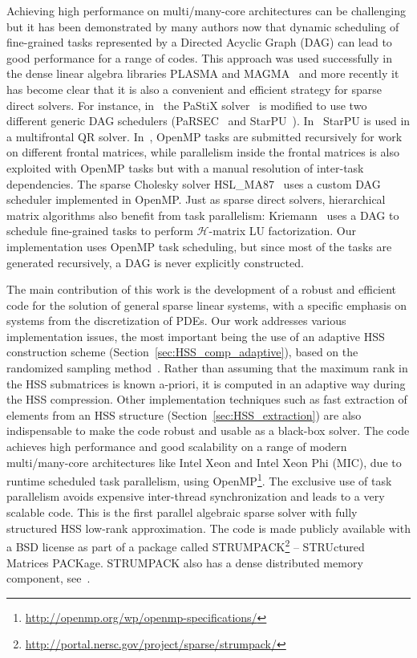 \documentclass{article}
\newcommand{\tm}{\textsuperscript{\textregistered}}
\begin{document}
Achieving high performance on multi/many-core architectures can be
challenging but it has been demonstrated by many authors now that
dynamic scheduling of fine-grained tasks represented by a Directed
Acyclic Graph (DAG) can lead to good performance for a range of codes.
This approach was used successfully in the dense linear algebra
libraries PLASMA and MAGMA~\cite{agullo2009numerical} and more
recently it has become clear that it is also a convenient and
efficient strategy for sparse direct solvers. For instance,
in~\cite{lacoste2014taking} the PaStiX solver~\cite{henon2002pastix}
is modified to use two different generic DAG schedulers
(PaRSEC~\cite{bosilca2012dague} and
StarPU~\cite{augonnet2011starpu}). In~\cite{agullo2013multifrontal}
StarPU is used in a multifrontal QR solver.
In~\cite{kim2014parallel}, OpenMP tasks are submitted recursively for
work on different frontal matrices, while parallelism inside the
frontal matrices is also exploited with OpenMP tasks but with a manual
resolution of inter-task dependencies. The sparse Cholesky solver
HSL\_MA87~\cite{hogg2010design} uses a custom DAG scheduler
implemented in OpenMP. Just as sparse direct solvers, hierarchical
matrix algorithms also benefit from task parallelism:
Kriemann~\cite{kriemann2013} uses a DAG to schedule fine-grained tasks
to perform $\mathcal{H}$-matrix LU factorization. Our implementation
uses OpenMP task scheduling, but since most of the tasks are generated
recursively, a DAG is never explicitly constructed.

The main contribution of this work is the development of a robust and
efficient code for the solution of general sparse linear systems, with
a specific emphasis on systems from the discretization of PDEs.
Our work addresses various implementation issues, the most important
being the use of an adaptive HSS construction scheme
(Section~\ref{sec:HSS_comp_adaptive}), based on the randomized
sampling method~\cite{martinsson2011fast}.  Rather than assuming that
the maximum rank in the HSS submatrices is known a-priori, it is
computed in an adaptive way during the HSS compression. Other
implementation techniques such as fast extraction of elements from an
HSS structure (Section~\ref{sec:HSS_extraction}) are also
indispensable to make the code robust and usable as a black-box
solver.  The code achieves high performance and good scalability on a
range of modern multi/many-core architectures like Intel\tm{} Xeon and
Intel\tm{} Xeon Phi (MIC), due to runtime scheduled task parallelism,
using
OpenMP\footnote{\url{http://openmp.org/wp/openmp-specifications/}}.
The exclusive use of task parallelism avoids expensive inter-thread
synchronization and leads to a very scalable code.  This is the first
parallel algebraic sparse solver with fully structured HSS low-rank
approximation. The code is made publicly available with a BSD license
as part of a package called
STRUMPACK\footnote{\url{http://portal.nersc.gov/project/sparse/strumpack/}}
-- STRUctured Matrices PACKage. STRUMPACK also has a dense distributed
memory component, see~\cite{FHR}.
\end{document}
